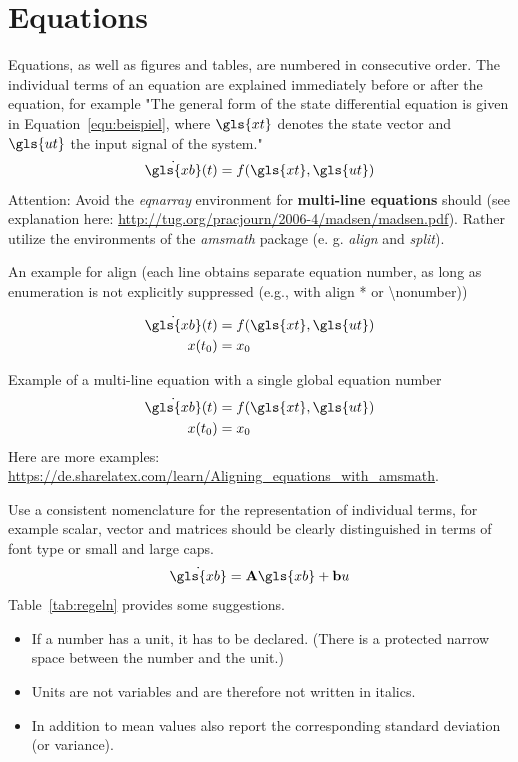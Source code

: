 \section{Equations}
\label{hinweise:gleichungen}
%
Equations, as well as figures and tables, are numbered in consecutive order.
The individual terms of an equation are explained immediately before or after the equation, for example "The general form of the state differential equation is given in Equation~\ref{equ:beispiel}, where $\gls{xt}$ denotes the state vector and $\gls{ut}$ the input signal of the system." %
%
\begin{equation}
  \dot{\gls{xb}}(t) = f(\gls{xt}, \gls{ut})
  \label{equ:beispiel}
\end{equation}
%
Attention: Avoid the \textit{eqnarray} environment for \textbf{multi-line equations}  should (see explanation here: \url{http://tug.org/pracjourn/2006-4/madsen/madsen.pdf}).
Rather utilize the environments of the \textit{amsmath} package (e. g. \textit{align} and \textit{split}).

An example for align (each line obtains separate  equation number, as long as enumeration is not explicitly suppressed (e.g., with align * or \textbackslash nonumber))

\begin{align}
    \dot{\gls{xb}}(t) &= f(\gls{xt}, \gls{ut}) \\
    x(t_0) &= x_0
\end{align}

Example of a multi-line equation with a single global equation number
\begin{equation}
\begin{split}
    \dot{\gls{xb}}(t) &= f(\gls{xt}, \gls{ut}) \\
    x(t_0) &= x_0
\end{split}
\end{equation}
Here are more examples: \sloppy\url{https://de.sharelatex.com/learn/Aligning_equations_with_amsmath}.


%
Use a consistent nomenclature for the representation of individual terms, for example scalar, vector and matrices should be clearly distinguished in terms of font type or small and large caps.
%
\begin{equation}
  \dot{\gls{xb}} = \mathbf{A} \gls{xb} + \mathbf{b} u
  \label{equ:beispiel2}
\end{equation}
%
Table~\ref{tab:regeln} provides some suggestions.

\begin{itemize}
  \item If a number has a unit, it has to be declared. (There is a protected narrow space between the number and the unit.)
  \item Units are not variables and are therefore not written in italics.
  \item In addition to  mean values also report the corresponding standard deviation (or variance).
\end{itemize}

